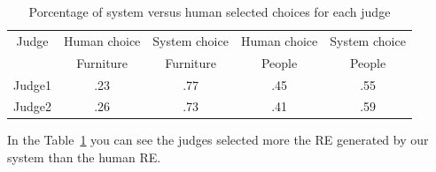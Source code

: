 
\begin{table}[h!]
\begin{center}
\begin{tabular}{|c|c|c|c|c|}
\hline
Judge    & Human choice & System choice  & Human choice & System choice \\
	 &    Furniture &    Furniture   &    People    &    People \\
\hline 
Judge1   & .23       & .77      & .45  & .55  \\
Judge2   & .26       & .73      & .41  & .59  \\
\hline
\end{tabular}
\caption{Porcentage of system versus human selected choices for each judge} 
\label{system-versus-human}
\end{center}
\end{table}
In the Table~\ref{system-versus-human} you can see the judges selected more the RE generated by our system than the human RE.



